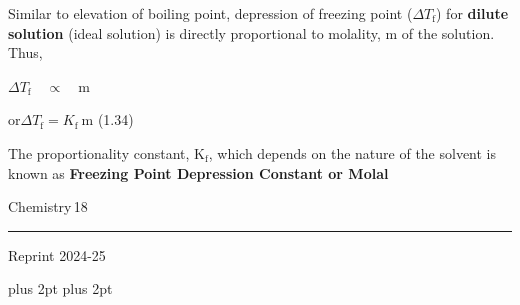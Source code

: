 \documentclass[11pt,a4paper]{article}
\renewcommand{\normalsize}{\fontsize{10.5bp}{12.7bp}\selectfont\abovedisplayskip=4pt plus 2pt\belowdisplayskip=4pt plus 2pt\abovedisplayshortskip=2pt\belowdisplayshortskip=2pt}
\begin{document}
\noindent\hfill\begin{minipage}[t]{0.74\textwidth}
\hspace*{1.5em}Similar to elevation of boiling point, depression of freezing point ($\Delta T_\text{f}$) for \textbf{dilute solution} (ideal solution) is directly proportional to molality, m of the solution. Thus,

\hspace*{3.5em}$\Delta T_\text{f} \quad\propto\quad \text{m}$

or\hspace{3.6em}$\Delta T_\text{f} = K_\text{f}\ \text{m}$ \hfill (1.34)

\hspace*{1.5em}The proportionality constant, K$_\text{f}$, which depends on the nature of the solvent is known as \textbf{Freezing Point Depression Constant or Molal}
\end{minipage}

\vfill
\noindent\begin{minipage}{0.3\textwidth}
{\color{gray}Chemistry}\hspace{6pt}\colorbox{Goldenrod1}{\color{gray}\,18\,}\\[-6pt]
{\color{Goldenrod1}\rule{\linewidth}{1pt}}
\end{minipage}
\begin{center}
{\sffamily\small Reprint 2024-25}
\end{center}

\normalsize

\end{document}
